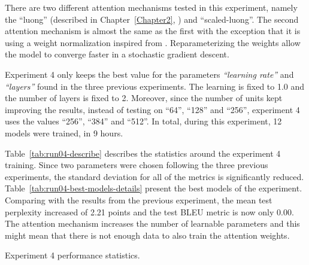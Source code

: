 There are two different attention mechanisms tested in this experiment, namely the ``luong'' (described in Chapter~\ref{Chapter2}, \citet{nmt-phd}) and ``scaled-luong''. The second attention mechanism is almost the same as the first with the exception that it is using a weight normalization inspired from \citet{1602.07868}. Reparameterizing the weights allow the model to converge faster in a stochastic gradient descent.

Experiment 4 only keeps the best value for the parameters \textit{``learning rate''} and \textit{``layers''} found in the three previous experiments. The learning is fixed to \num{1.0} and the number of layers is fixed to \num{2}.
Moreover, since the number of units kept improving the results, instead of testing on ``64'', ``128'' and ``256'', experiment 4 uses the values ``256'', ``384'' and ``512''. In total, during this experiment, 12 models were trained, in 9 hours.

Table~\ref{tab:run04-describe} describes the statistics around the experiment 4 training. Since two parameters were chosen following the three previous experiments, the standard deviation for all of the metrics is significantly reduced. Table~\ref{tab:run04-best-models-details} present the best models of the experiment.
Comparing with the results from the previous experiment, the mean test perplexity increased of \num{2.21} points and the test BLEU metric is now only \num{0.00}. The attention mechanism increases the number of learnable parameters and this might mean that there is not enough data to also train the attention weights.

\begin{table}
    \centering
    \caption[Experiment 4 performance statistics]{Experiment 4 performance statistics.}
    \label{tab:run04-describe}
    
\end{table}

